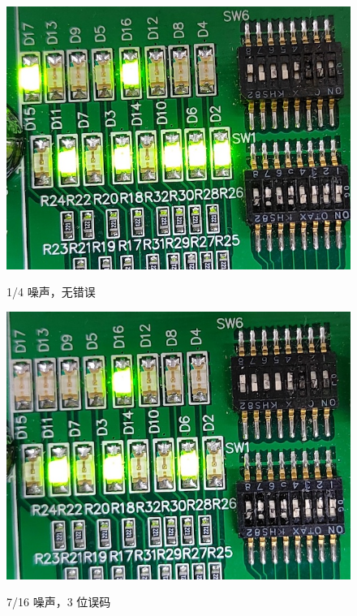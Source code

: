 \begin{figure}[h!]
    \begin{center}
        \begin{minipage}{0.48\linewidth}
    		\centerline{\includegraphics[width=\textwidth]{static/result_noise_1_256.jpg}}
    		\centerline{1/4 噪声，无错误}
    	\end{minipage}
        \hfill
    	\begin{minipage}{0.48\linewidth}
    		\centerline{\includegraphics[width=\textwidth]{static/result_noise_7_16.jpg}}
    		\centerline{7/16 噪声，3 位误码}
    	\end{minipage}
        \\

\end{center}
\end{figure}
